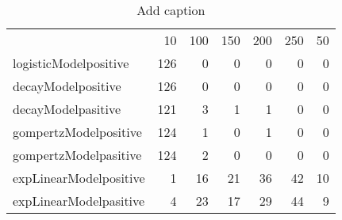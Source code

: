 \begin{table}[htbp]
  \centering
  \caption{Add caption}
    \begin{tabular}{lrrrrrr}
          & 10    & 100   & 150   & 200   & 250   & 50 \\
    logisticModelpositive & 126   & 0     & 0     & 0     & 0     & 0 \\
    decayModelpositive & 126   & 0     & 0     & 0     & 0     & 0 \\
    decayModelpasitive & 121   & 3     & 1     & 1     & 0     & 0 \\
    gompertzModelpositive & 124   & 1     & 0     & 1     & 0     & 0 \\
    gompertzModelpasitive & 124   & 2     & 0     & 0     & 0     & 0 \\
    expLinearModelpositive & 1     & 16    & 21    & 36    & 42    & 10 \\
    expLinearModelpasitive & 4     & 23    & 17    & 29    & 44    & 9 \\
    \end{tabular}%
  \label{tab:addlabel}%
\end{table}%
